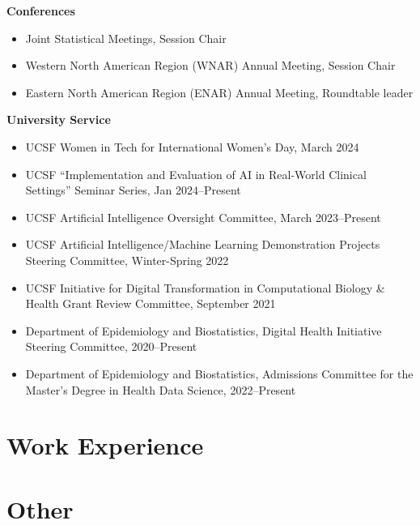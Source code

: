\documentclass[11pt,a4paper,sans]{moderncv}        %
\begin{document}
\textbf{Conferences}
\begin{itemize}
\item Joint Statistical Meetings, Session Chair
\item Western North American Region (WNAR) Annual Meeting, Session Chair
\item Eastern North American Region (ENAR) Annual Meeting, Roundtable leader
\end{itemize}

\textbf{University Service}
\begin{itemize}
	\item UCSF Women in Tech for International Women's Day, March 2024 
	\item UCSF ``Implementation and Evaluation of AI in Real-World Clinical Settings'' Seminar Series, Jan 2024--Present
	\item UCSF Artificial Intelligence Oversight Committee, March 2023--Present
    \item UCSF Artificial Intelligence/Machine Learning Demonstration Projects Steering Committee, Winter-Spring 2022
	\item UCSF Initiative for Digital Transformation in Computational Biology \& Health Grant Review Committee, September 2021
	\item Department of Epidemiology and Biostatistics, Digital Health Initiative Steering Committee, 2020--Present
	\item Department of Epidemiology and Biostatistics, Admissions Committee for the Master's Degree in Health Data Science, 2022--Present
\end{itemize}

\section{Work Experience}

\section{Other}
\end{document}
